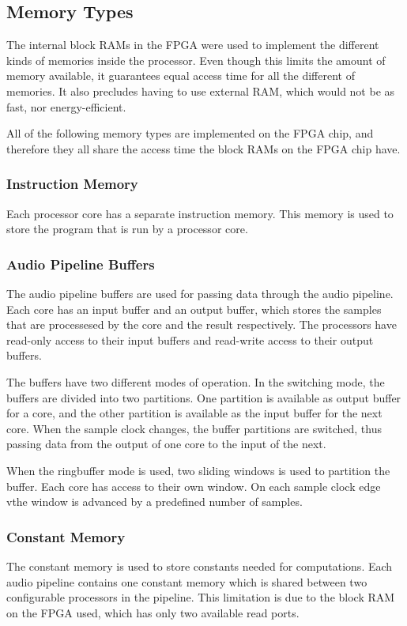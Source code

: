 
\subsection{Memory Types}\label{subsec:fpga-memory}

The internal block RAMs in the FPGA were used to implement the different kinds
of memories inside the processor. Even though this limits the amount of
memory available, it guarantees equal access time for all the different
of memories. It also precludes having to use external RAM, which would not be as
fast, nor energy-efficient.

All of the following memory types are implemented on the FPGA chip, and
therefore they all share the access time the block RAMs on the FPGA chip have.

\subsubsection{Instruction Memory}
Each processor core has a separate instruction memory. This memory is used to
store the program that is run by a processor core.

\subsubsection{Audio Pipeline Buffers}
The audio pipeline buffers are used for passing data through the audio pipeline.
Each core has an input buffer and an output buffer, which stores the samples
that are processesed by the core and the result respectively. The processors
have read-only access to their input buffers and read-write access to their
output buffers.

The buffers have two different modes of operation. In the switching mode,
the buffers are divided into two partitions. One partition is available
as output buffer for a core, and the other partition is available as the
input buffer for the next core. When the sample clock
changes, the buffer partitions are switched, thus passing data from the
output of one core to the input of the next.

When the ringbuffer mode is used, two sliding windows is used to partition
the buffer. Each core has access to their own window. On each sample clock
edge vthe window is advanced by a predefined number
of samples.

\subsubsection{Constant Memory}
The constant memory is used to store constants needed for computations. Each
audio pipeline contains one constant memory which is shared between two
configurable processors in the pipeline. This limitation is due to the block
RAM on the FPGA used, which has only two available read ports.

